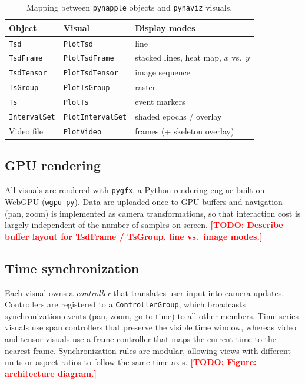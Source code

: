 \documentclass[11pt]{article}
\newcommand{\todo}[1]{\textcolor{red}{\textbf{[TODO: #1]}}}
\newcommand{\pynaviz}{\texttt{pynaviz}}
\newcommand{\pynapple}{\texttt{pynapple}}
\begin{document}
\begin{table}[h]
\centering
\caption{Mapping between \pynapple{} objects and \pynaviz{} visuals.}
\label{tab:visuals}
\begin{tabular}{@{}lll@{}}
\toprule
Object & Visual & Display modes \\
\midrule
\texttt{Tsd}         & \texttt{PlotTsd}         & line \\
\texttt{TsdFrame}    & \texttt{PlotTsdFrame}    & stacked lines, heat map, $x$ vs.\ $y$ \\
\texttt{TsdTensor}   & \texttt{PlotTsdTensor}   & image sequence \\
\texttt{TsGroup}     & \texttt{PlotTsGroup}     & raster \\
\texttt{Ts}          & \texttt{PlotTs}          & event markers \\
\texttt{IntervalSet} & \texttt{PlotIntervalSet} & shaded epochs / overlay \\
Video file           & \texttt{PlotVideo}       & frames (+ skeleton overlay) \\
\bottomrule
\end{tabular}
\end{table}

\subsection{GPU rendering}
All visuals are rendered with \texttt{pygfx}, a Python rendering engine built
on WebGPU (\texttt{wgpu-py}). Data are uploaded once to GPU buffers and
navigation (pan, zoom) is implemented as camera transformations, so that
interaction cost is largely independent of the number of samples on screen.
\todo{Describe buffer layout for TsdFrame / TsGroup, line vs.\ image modes.}

\subsection{Time synchronization}
Each visual owns a \emph{controller} that translates user input into camera
updates. Controllers are registered to a \texttt{ControllerGroup}, which
broadcasts synchronization events (pan, zoom, go-to-time) to all other
members. Time-series visuals use span controllers that preserve the visible
time window, whereas video and tensor visuals use a frame controller that
maps the current time to the nearest frame. Synchronization rules are
modular, allowing views with different units or aspect ratios to follow the
same time axis. \todo{Figure: architecture diagram.}
\end{document}
